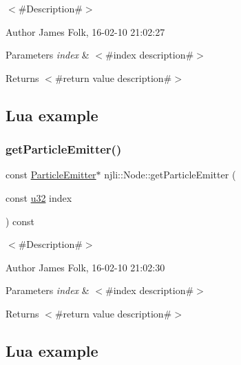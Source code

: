 $<$\#\+Description\#$>$ 

\begin{DoxyAuthor}{Author}
James Folk, 16-\/02-\/10 21\+:02\+:27
\end{DoxyAuthor}

\begin{DoxyParams}{Parameters}
{\em index} & $<$\#index description\#$>$\\
\hline
\end{DoxyParams}
\begin{DoxyReturn}{Returns}
$<$\#return value description\#$>$
\end{DoxyReturn}
\hypertarget{classnjli_1_1_steering_behavior_wander_ex1}{}\subsection{Lua example}\label{classnjli_1_1_steering_behavior_wander_ex1}

\begin{DoxyCodeInclude}
\end{DoxyCodeInclude}
\mbox{\label{classnjli_1_1_node_a5c98aa47fcea68502023ac465951d8cf}} 
\subsubsection{\texorpdfstring{get\+Particle\+Emitter()}{getParticleEmitter()}\hspace{0.1cm}{\footnotesize\ttfamily [2/2]}}
{\footnotesize\ttfamily const \mbox{\hyperlink{classnjli_1_1_particle_emitter}{Particle\+Emitter}}$\ast$ njli\+::\+Node\+::get\+Particle\+Emitter (\begin{DoxyParamCaption}\item[{const \mbox{\hyperlink{_util_8h_a10e94b422ef0c20dcdec20d31a1f5049}{u32}}}]{index }\end{DoxyParamCaption}) const}



$<$\#\+Description\#$>$ 

\begin{DoxyAuthor}{Author}
James Folk, 16-\/02-\/10 21\+:02\+:30
\end{DoxyAuthor}

\begin{DoxyParams}{Parameters}
{\em index} & $<$\#index description\#$>$\\
\hline
\end{DoxyParams}
\begin{DoxyReturn}{Returns}
$<$\#return value description\#$>$
\end{DoxyReturn}
\hypertarget{classnjli_1_1_steering_behavior_wander_ex1}{}\subsection{Lua example}\label{classnjli_1_1_steering_behavior_wander_ex1}

